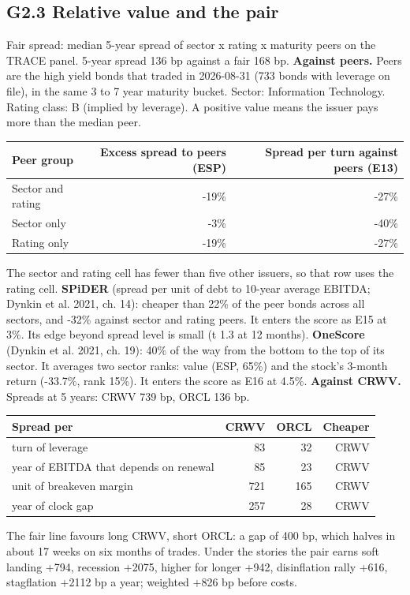 \documentclass[11pt,a4paper]{article}
\begin{document}
\subsection*{G2.3 Relative value and the pair}
Fair spread: median 5-year spread of sector x rating x maturity peers on the TRACE panel. 5-year spread 136 bp against a fair 168 bp.
\textbf{Against peers.} Peers are the high yield bonds that traded in 2026-08-31 (733 bonds with leverage on file), in the same 3 to 7 year maturity bucket. Sector: Information Technology. Rating class: B (implied by leverage). A positive value means the issuer pays more than the median peer.
\begin{center}\footnotesize\setlength{\tabcolsep}{3.5pt}\begin{tabular}{@{}lrr@{}}\toprule
Peer group & Excess spread to peers (ESP) & Spread per turn against peers (E13) \\\midrule
Sector and rating & -19\% & -27\% \\
Sector only & -3\% & -40\% \\
Rating only & -19\% & -27\% \\
\bottomrule\end{tabular}\end{center}
The sector and rating cell has fewer than five other issuers, so that row uses the rating cell.
\textbf{SPiDER} (spread per unit of debt to 10-year average EBITDA; Dynkin et al. 2021, ch. 14): cheaper than 22\% of the peer bonds across all sectors, and -32\% against sector and rating peers. It enters the score as E15 at 3\%. Its edge beyond spread level is small (t 1.3 at 12 months).
\textbf{OneScore} (Dynkin et al. 2021, ch. 19): 40\% of the way from the bottom to the top of its sector. It averages two sector ranks: value (ESP, 65\%) and the stock's 3-month return (-33.7\%, rank 15\%). It enters the score as E16 at 4.5\%.
\textbf{Against CRWV.} Spreads at 5 years: CRWV 739 bp, ORCL 136 bp.
\begin{center}\footnotesize\setlength{\tabcolsep}{3.5pt}\begin{tabular}{@{}lrrr@{}}\toprule
Spread per & CRWV & ORCL & Cheaper \\\midrule
turn of leverage & 83 & 32 & CRWV \\
year of EBITDA that depends on renewal & 85 & 23 & CRWV \\
unit of breakeven margin & 721 & 165 & CRWV \\
year of clock gap & 257 & 28 & CRWV \\
\bottomrule\end{tabular}\end{center}
The fair line favours long CRWV, short ORCL: a gap of 400 bp, which halves in about 17 weeks on six months of trades. Under the stories the pair earns soft landing +794, recession +2075, higher for longer +942, disinflation rally +616, stagflation +2112 bp a year; weighted +826 bp before costs.
\end{document}
